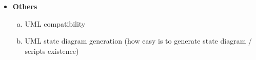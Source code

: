 \begin{itemize}
\item \textbf{Others}
    \begin{enumerate}[a)]
        \item UML compatibility
        \item UML state diagram generation (how easy is to generate state diagram / scripts existence)
    \end{enumerate}

\end{itemize}
\begin{table}[ht]

\newcommand{\yes}{\cellcolor{green}\checkmark}
\newcommand{\simple}{\cellcolor{green}simple}
\newcommand{\some}{\cellcolor{yellow}no superstate}
\newcommand{\no}{\cellcolor{red}-}
\newcommand{\verify}{\cellcolor{yellow}?}
\newcommand{\x}{\cellcolor{white}x}
\newcommand{\notall}{\cellcolor{orange}not all}


\end{table}
